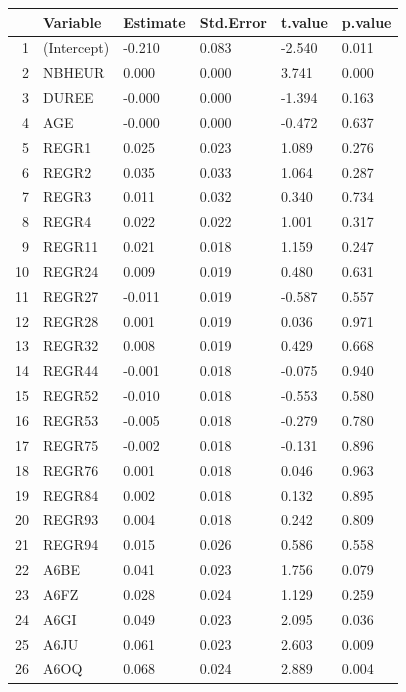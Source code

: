 \begin{table}[ht]
\centering
\begin{tabular}{rlllll}
  \toprule
 & Variable & Estimate & Std.Error & t.value & p.value \\ 
  \midrule
1 & (Intercept) & -0.210 & 0.083 & -2.540 & 0.011 \\ 
  2 & NBHEUR & 0.000 & 0.000 & 3.741 & 0.000 \\ 
  3 & DUREE & -0.000 & 0.000 & -1.394 & 0.163 \\ 
  4 & AGE & -0.000 & 0.000 & -0.472 & 0.637 \\ 
  5 & REGR1 & 0.025 & 0.023 & 1.089 & 0.276 \\ 
  6 & REGR2 & 0.035 & 0.033 & 1.064 & 0.287 \\ 
  7 & REGR3 & 0.011 & 0.032 & 0.340 & 0.734 \\ 
  8 & REGR4 & 0.022 & 0.022 & 1.001 & 0.317 \\ 
  9 & REGR11 & 0.021 & 0.018 & 1.159 & 0.247 \\ 
  10 & REGR24 & 0.009 & 0.019 & 0.480 & 0.631 \\ 
  11 & REGR27 & -0.011 & 0.019 & -0.587 & 0.557 \\ 
  12 & REGR28 & 0.001 & 0.019 & 0.036 & 0.971 \\ 
  13 & REGR32 & 0.008 & 0.019 & 0.429 & 0.668 \\ 
  14 & REGR44 & -0.001 & 0.018 & -0.075 & 0.940 \\ 
  15 & REGR52 & -0.010 & 0.018 & -0.553 & 0.580 \\ 
  16 & REGR53 & -0.005 & 0.018 & -0.279 & 0.780 \\ 
  17 & REGR75 & -0.002 & 0.018 & -0.131 & 0.896 \\ 
  18 & REGR76 & 0.001 & 0.018 & 0.046 & 0.963 \\ 
  19 & REGR84 & 0.002 & 0.018 & 0.132 & 0.895 \\ 
  20 & REGR93 & 0.004 & 0.018 & 0.242 & 0.809 \\ 
  21 & REGR94 & 0.015 & 0.026 & 0.586 & 0.558 \\ 
  22 & A6BE & 0.041 & 0.023 & 1.756 & 0.079 \\ 
  23 & A6FZ & 0.028 & 0.024 & 1.129 & 0.259 \\ 
  24 & A6GI & 0.049 & 0.023 & 2.095 & 0.036 \\ 
  25 & A6JU & 0.061 & 0.023 & 2.603 & 0.009 \\ 
  26 & A6OQ & 0.068 & 0.024 & 2.889 & 0.004 \\ 

\end{tabular}
\end{table}
